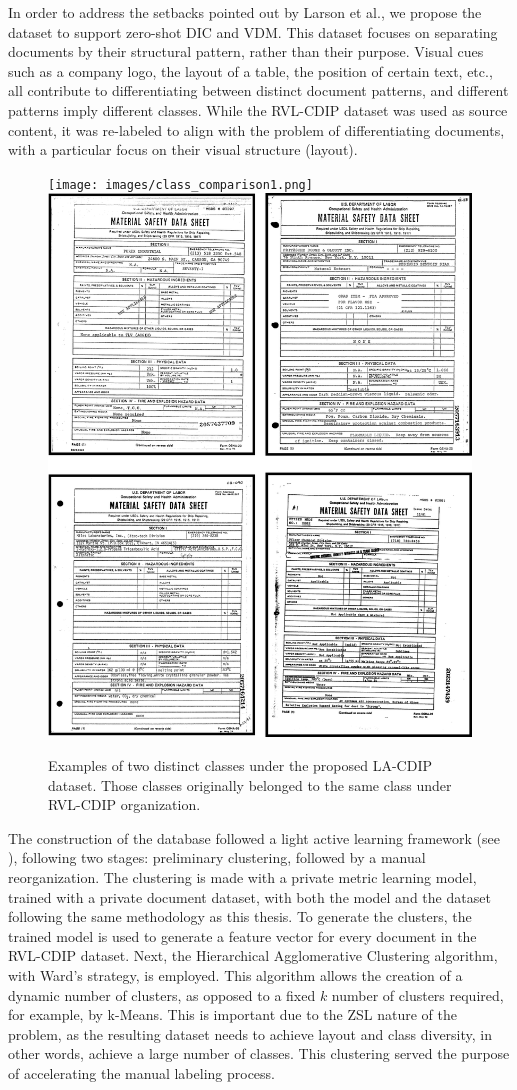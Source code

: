 In order to address the setbacks pointed out by Larson et al., we propose the  dataset to support zero-shot \gls{DIC} and \gls{VDM}. This dataset focuses on separating documents by their structural pattern, rather than their purpose. Visual cues such as a company logo, the layout of a table, the position of certain text, etc., all contribute to differentiating between distinct document patterns, and different patterns imply different classes. While the \gls{RVL-CDIP} dataset was used as source content, it was re-labeled to align with the problem of differentiating documents, with a particular focus on their visual structure (layout). 

\begin{figure}[htbp]
  \centering
\texttt{[image: images/class\_comparison1.png]} \hspace{.04\textwidth}
    \includegraphics[width=.455\textwidth]{images/class_comparison2.png}

\caption{Examples of two distinct classes under the proposed \gls{LA-CDIP} dataset. Those classes originally belonged to the same class under RVL-CDIP organization.\label{img:dataset}}
\end{figure}   

The construction of the database followed a light active learning framework (see ), following two stages: preliminary clustering, followed by a manual reorganization. The clustering is made with a private metric learning model, trained with a private document dataset, with both the model and the dataset following the same methodology as this thesis. To generate the clusters, the trained model is used to generate a feature vector for every document in the \gls{RVL-CDIP} dataset. Next, the Hierarchical Agglomerative Clustering algorithm, with Ward's\cite{ward_jr_hierarchical_1963} strategy, is employed. This algorithm allows the creation of a dynamic number of clusters, as opposed to a fixed $k$ number of clusters required, for example, by k-Means. This is important due to the \gls{ZSL} nature of the problem, as the resulting dataset needs to achieve layout and class diversity, in other words, achieve a large number of classes. This clustering served the purpose of accelerating the manual labeling process.

